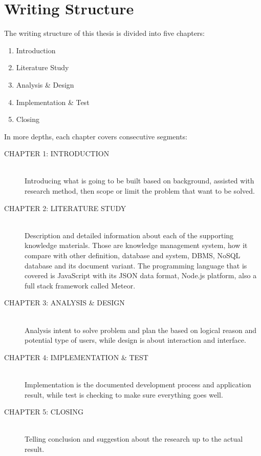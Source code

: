 \section{Writing Structure}
\label{sec:writing-structure}

The writing structure of this thesis is divided into five chapters:

\begin{enumerate}
\item Introduction
\item Literature Study
\item Analysis \& Design
\item Implementation \& Test
\item Closing
\end{enumerate}

\noindent In more depths, each chapter covers consecutive segments:

\begin{description}
\item [CHAPTER 1: INTRODUCTION] \hfill \\
Introducing what is going to be built based on background, assisted with research method, then scope or limit the problem that want to be solved.
\item [CHAPTER 2: LITERATURE STUDY] \hfill \\
Description and detailed information about each of the supporting knowledge materials. Those are knowledge management system, how it compare with other definition, database and system, \ac{DBMS}, \ac{NoSQL} database and its document variant. The programming language that is covered is JavaScript with its \ac{JSON} data format, Node.js platform, also a full stack framework called Meteor.
\item [CHAPTER 3: ANALYSIS \& DESIGN] \hfill \\
Analysis intent to solve problem and plan the based on logical reason and potential type of users, while design is about interaction and interface.
\item [CHAPTER 4: IMPLEMENTATION \& TEST] \hfill \\
Implementation is the documented development process and application result, while test is checking to make sure everything goes well.
\item [CHAPTER 5: CLOSING] \hfill \\
Telling conclusion and suggestion about the research up to the actual result.
\end{description}
